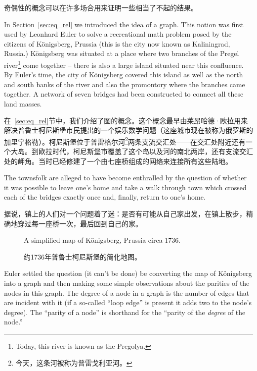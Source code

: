 奇偶性的概念可以在许多场合用来证明一些相当了不起的结果。

In Section~\ref{sec:eq_rel} we introduced the idea of a graph.  This
notion was first used by  Leonhard Euler to solve
a recreational math problem posed by the citizens of 
K\"{o}nigsberg, Prussia (this is the city now known
as  Kaliningrad, Russia.)  K\"{o}nigsberg was situated 
at a place where two branches of the  Pregel river\footnote{Today, this river is known as the Pregolya.} come together -- there is also
a large island situated near this confluence.  By Euler's time, the city of
 K\"{o}nigsberg covered this island as well as the north and south banks of the
river and also the promontory where the branches came together.  A network of
seven bridges had been constructed to connect all these land masses.

在~\ref{sec:eq_rel}节中，我们介绍了图的概念。这个概念最早由莱昂哈德·欧拉用来解决普鲁士柯尼斯堡市民提出的一个娱乐数学问题（这座城市现在被称为俄罗斯的加里宁格勒）。柯尼斯堡位于普雷格尔河\footnote{今天，这条河被称为普雷戈利亚河。}两条支流交汇处——在交汇处附近还有一个大岛。到欧拉时代，柯尼斯堡市覆盖了这个岛以及河的南北两岸，还有支流交汇处的岬角。当时已经修建了一个由七座桥组成的网络来连接所有这些陆地。

The
townsfolk are alleged to have become enthralled by the question of whether it
was possible to leave one's home and take a walk through town
which crossed each of the bridges exactly once and, finally, return to one's
home.

据说，镇上的人们对一个问题着了迷：是否有可能从自己家出发，在镇上散步，精确地穿过每一座桥一次，最后回到自己的家。

\begin{figure}[!hbtp]
\begin{center}

\end{center}
\caption[K\"{o}nigsberg, Prussia.]{A simplified map of K\"{o}nigsberg, Prussia
circa 1736.}
\caption[普鲁士，柯尼斯堡。]{约1736年普鲁士柯尼斯堡的简化地图。}
\label{fig:kon_map} 
\end{figure}

Euler settled the question (it can't be done) be converting the map of 
K\"{o}nigsberg into a graph and then making some simple observations about
the parities of the nodes in this graph.  The  degree of a node
in a graph is the number of edges that are incident with it (if a so-called
``loop edge'' is present it adds two to the node's degree).  The ``parity
of a node'' is shorthand for the ``parity of the \emph{degree} of the node.'' 
 
